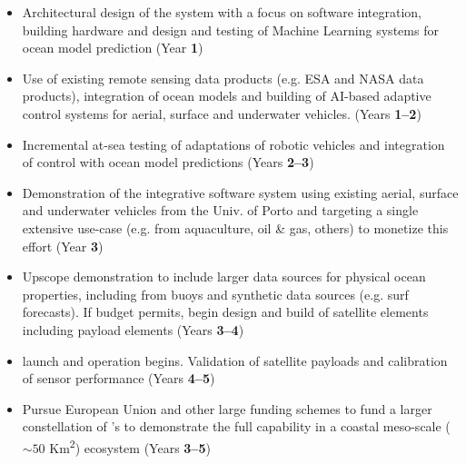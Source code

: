 \documentclass[12pt]{article}
\begin{document}
\begin{itemize}[noitemsep,topsep=0pt,parsep=0pt,partopsep=0pt]

\item Architectural design of the system with a focus on software
  integration, building hardware and design and testing of Machine
  Learning systems for ocean model prediction (Year \textbf{1})

\item Use of existing remote sensing data products (e.g. ESA and NASA
  data products), integration of ocean models and building of AI-based
  adaptive control systems for aerial, surface and underwater
  vehicles.  (Years \textbf{1--2})

\item Incremental at-sea testing of adaptations of robotic vehicles
  and integration of control with ocean model predictions (Years
  \textbf{2--3}) 

  
\item Demonstration of the integrative software system using existing
  aerial, surface and underwater vehicles from the Univ. of Porto and
  targeting a single extensive use-case (e.g. from aquaculture, oil \&
  gas, others) to monetize this effort (Year \textbf{3})

\item Upscope demonstration to include larger data sources for
  physical ocean properties, including from buoys and synthetic data
  sources (e.g. surf forecasts). If \sml budget permits, begin design
  and build of satellite elements including payload elements (Years
  \textbf{3--4})

\item \sml launch and operation begins. Validation of satellite
  payloads and calibration of sensor performance (Years \textbf{4--5})

\item Pursue European Union and other large funding schemes to fund a
  larger constellation of \smle's to demonstrate the full capability
  in a coastal meso-scale ($\sim 50$ Km\textsuperscript{2}) ecosystem
  (Years \textbf{3--5})

\end{itemize}
\end{document}
